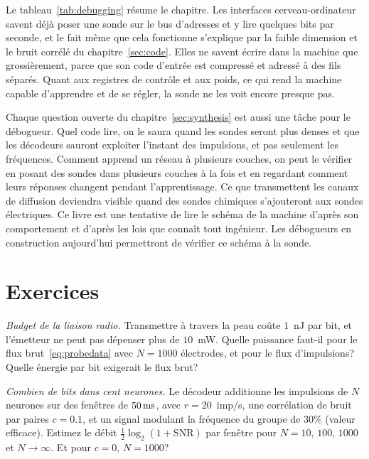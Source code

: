 Le tableau~\ref{tab:debugging} résume le chapitre. Les interfaces cerveau-ordinateur savent déjà poser une sonde sur le bus d'adresses et y lire quelques bits par seconde, et le fait même que cela fonctionne s'explique par la faible dimension et le bruit corrélé du chapitre~\ref{sec:code}. Elles ne savent écrire dans la machine que grossièrement, parce que son code d'entrée est compressé et adressé à des fils séparés. Quant aux registres de contrôle et aux poids, ce qui rend la machine capable d'apprendre et de se régler, la sonde ne les voit encore presque pas.

Chaque question ouverte du chapitre~\ref{sec:synthesis} est aussi une tâche pour le débogueur. Quel code lire, on le saura quand les sondes seront plus denses et que les décodeurs sauront exploiter l'instant des impulsions, et pas seulement les fréquences. Comment apprend un réseau à plusieurs couches, on peut le vérifier en posant des sondes dans plusieurs couches à la fois et en regardant comment leurs réponses changent pendant l'apprentissage. Ce que transmettent les canaux de diffusion deviendra visible quand des sondes chimiques s'ajouteront aux sondes électriques. Ce livre est une tentative de lire le schéma de la machine d'après son comportement et d'après les lois que connaît tout ingénieur. Les débogueurs en construction aujourd'hui permettront de vérifier ce schéma à la sonde.

\section{Exercices}

\begin{exercise}[\lvlA]
\label{ex:17:1}
\emph{Budget de la liaison radio.} Transmettre à travers la peau coûte $1$~nJ par bit, et l'émetteur ne peut pas dépenser plus de $10$~mW. Quelle puissance faut-il pour le flux brut~\eqref{eq:probedata} avec $N=1000$ électrodes, et pour le flux d'impulsions? Quelle énergie par bit exigerait le flux brut?
\end{exercise}

\begin{exercise}[\lvlA]
\label{ex:17:2}
\emph{Combien de bits dans cent neurones.} Le décodeur additionne les impulsions de $N$ neurones sur des fenêtres de $50\,\text{ms}$, avec $r=20$~imp/s, une corrélation de bruit par paires $c=0.1$, et un signal modulant la fréquence du groupe de $30\%$ (valeur efficace). Estimez le débit $\tfrac12\log_2(1+\text{SNR})$ par fenêtre pour $N=10$, $100$, $1000$ et $N\to\infty$. Et pour $c=0$, $N=1000$?
\end{exercise}

